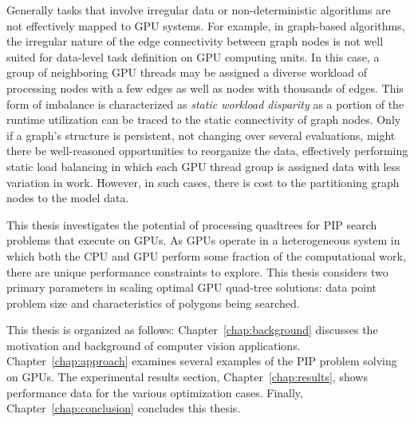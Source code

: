 Generally tasks that involve irregular data or non-deterministic
algorithms are not effectively mapped to GPU systems.  For example, in
graph-based algorithms, the irregular nature of the edge connectivity
between graph nodes is not well suited for data-level task definition
on GPU computing units. In this case, a group of neighboring GPU
threads may be assigned a diverse workload of processing nodes with a
few edges as well as nodes with thousands of edges.  This form of
imbalance is characterized as {\em static workload disparity} as a
portion of the runtime utilization can be traced to the static
connectivity of graph nodes.  Only if a graph's structure is
persistent, not changing over several evaluations, might there be
well-reasoned opportunities to reorganize the data, effectively
performing static load balancing in which each GPU thread group is
assigned data with less variation in work.  However, in such cases,
there is cost to the partitioning graph nodes to the model data.

This thesis investigates the potential of processing quadtrees for PIP search problems
that execute on GPUs.  As GPUs operate in a heterogeneous system in which both
the CPU and GPU perform some fraction of the computational work, there are
unique performance constraints to explore.  This thesis considers two primary parameters
in scaling optimal GPU quad-tree solutions: data point problem size and characteristics of polygons being searched.


This thesis is organized as follows:
Chapter~\ref{chap:background} discusses the motivation and background of computer vision applications.
Chapter~\ref{chap:approach} examines several examples of the PIP problem solving on GPUs.
The experimental results section, Chapter~\ref{chap:results}, shows performance
data for the various optimization cases.  Finally, Chapter~\ref{chap:conclusion} concludes this
thesis.


